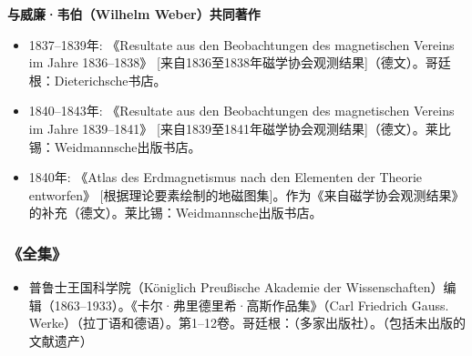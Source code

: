 \textbf{与威廉·韦伯（Wilhelm Weber）共同著作}

\begin{itemize}
\item 1837–1839年: 《Resultate aus den Beobachtungen des magnetischen Vereins im Jahre 1836–1838》 [来自1836至1838年磁学协会观测结果]（德文）。哥廷根：Dieterichsche书店。
\item 1840–1843年: 《Resultate aus den Beobachtungen des magnetischen Vereins im Jahre 1839–1841》 [来自1839至1841年磁学协会观测结果]（德文）。莱比锡：Weidmannsche出版书店。
\item 1840年: 《Atlas des Erdmagnetismus nach den Elementen der Theorie entworfen》 [根据理论要素绘制的地磁图集]。作为《来自磁学协会观测结果》的补充（德文）。莱比锡：Weidmannsche出版书店。
\end{itemize}
\subsubsection{《全集》}
\begin{itemize}
\item 普鲁士王国科学院（Königlich Preußische Akademie der Wissenschaften）编辑（1863–1933）。《卡尔·弗里德里希·高斯作品集》（Carl Friedrich Gauss. Werke）（拉丁语和德语）。第1–12卷。哥廷根：（多家出版社）。（包括未出版的文献遗产）
\end{itemize}
